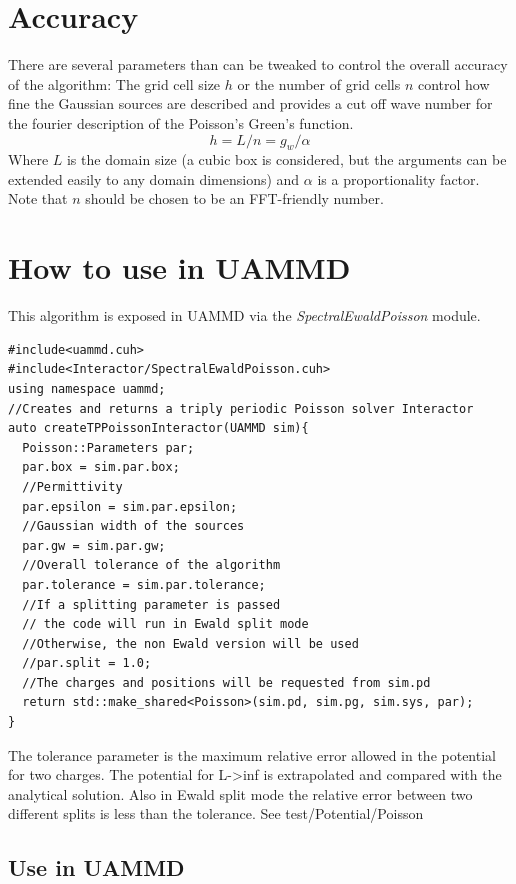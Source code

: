 \documentclass[ twoside,openright,titlepage,numbers=noenddot,%
headinclude,footinclude,cleardoublepage=empty,abstract=on,
BCOR=5mm,paper=a4,fontsize=11pt, dvipsnames
]{scrreprt}
\def\ucpp{uammd_cpp_lexer.py:UAMMDCppLexer -x}
\newcommand{\uammd}{\gls{UAMMD}\xspace}
\begin{document}
\section{Accuracy}
There are several parameters than can be tweaked to control the overall accuracy of the algorithm:
The grid cell size $h$ or the number of grid cells $n$ control how fine the Gaussian sources are described and provides a cut off wave number for the fourier description of the Poisson's Green's function.
\begin{equation}
h = L/n = g_w/\alpha
\end{equation}
Where $L$ is the domain size (a cubic box is considered, but the arguments can be extended easily to any domain dimensions) and $\alpha$ is a proportionality factor. Note that $n$ should be chosen to be an \gls{FFT}-friendly number.


\section{How to use in UAMMD}

This algorithm is exposed in \uammd via the \emph{SpectralEwaldPoisson} module.

\begin{verbatim}
#include<uammd.cuh>
#include<Interactor/SpectralEwaldPoisson.cuh>
using namespace uammd;
//Creates and returns a triply periodic Poisson solver Interactor
auto createTPPoissonInteractor(UAMMD sim){
  Poisson::Parameters par;
  par.box = sim.par.box;
  //Permittivity
  par.epsilon = sim.par.epsilon;
  //Gaussian width of the sources
  par.gw = sim.par.gw; 
  //Overall tolerance of the algorithm
  par.tolerance = sim.par.tolerance;
  //If a splitting parameter is passed
  // the code will run in Ewald split mode
  //Otherwise, the non Ewald version will be used
  //par.split = 1.0;
  //The charges and positions will be requested from sim.pd
  return std::make_shared<Poisson>(sim.pd, sim.pg, sim.sys, par);
}
\end{verbatim}
The tolerance parameter is the maximum relative error allowed in the potential for two charges. The potential for L->inf is extrapolated and compared with the analytical solution. Also in Ewald split mode the relative error between two different splits is less than the tolerance. See test/Potential/Poisson  


\subsection{Use in UAMMD}
\end{document}
